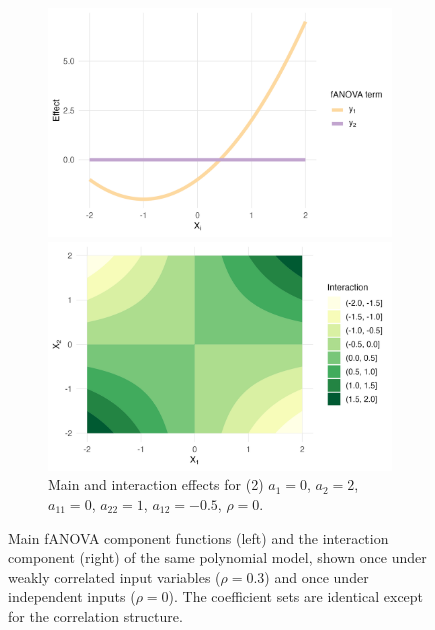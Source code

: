 \begin{figure}[htpb]
    \begin{subfigure}[t]{\textwidth}
        \centering
        \begin{minipage}[t]{0.49\textwidth}
            \includegraphics[width=\textwidth]{images/experiment_section/full_a1p20_a2p00_a11p10_a22p00_a12p05_rhop00_main.png}
        \end{minipage}%
        \hfill
        \begin{minipage}[t]{0.49\textwidth}
            \includegraphics[width=\textwidth]{images/experiment_section/full_a1p20_a2p00_a11p10_a22p00_a12p05_rhop00_interaction.png}
        \end{minipage}
        \caption{Main and interaction effects for (2) $a_1 = 0$, $a_2 = 2$, 
                 $a_{11} = 0$, $a_{22} = 1$, $a_{12} = -0.5$, $\rho = 0$.}
    \end{subfigure}
    \caption{Main fANOVA component functions (left) and the interaction component 
(right) of the same polynomial model, shown once under weakly correlated input variables 
($\rho = 0.3$) and once under independent inputs ($\rho = 0$). 
The coefficient sets are identical except for the correlation structure.}
    \label{fig:all_pair_01}
\end{figure}

